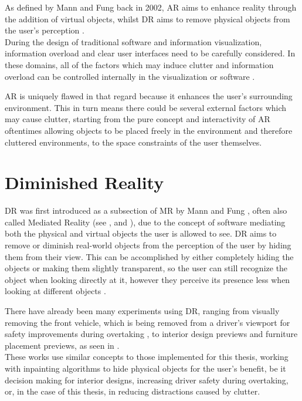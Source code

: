 As defined by Mann and Fung back in 2002, AR aims to enhance reality through the addition of virtual objects, whilst DR aims to remove physical objects from the user's perception \cite{Mann2002}.\\
During the design of traditional software and information visualization, information overload and clear user interfaces need to be carefully considered.
In these domains, all of the factors which may induce clutter and information overload can be controlled internally in the visualization or software \cite{RosenholtzRuth2007Mvc}.

AR is uniquely flawed in that regard because it enhances the user's surrounding environment. This in turn means there could be several external factors which may cause clutter, starting from the pure concept and interactivity of AR
oftentimes allowing objects to be placed freely in the environment and therefore cluttered environments, to the space constraints of the user themselves.

\section{Diminished Reality}
DR was first introduced as a subsection of MR by Mann and Fung \cite{Mann2002}, often also called Mediated Reality (see \cite{mann2002mediated}, \cite{grasset2003interactive} and \cite{PoelmanAkmanLukotsch2012}), due to the concept of software mediating both the physical and virtual objects the user is allowed to see.
DR aims to remove or diminish real-world objects from the perception of the user by hiding them from their view. This can be accomplished by either completely hiding the objects or making them slightly transparent, so the user can still recognize the object when looking directly at it,
however they perceive its presence less when looking at different objects \cite{ChengYiFei2022TUDR}.

There have already been many experiments using DR, ranging from visually removing the front vehicle, which is being removed from a driver's viewport for safety improvements during overtaking \cite{RameauFrancois2016ARAR}, to interior design previews and furniture placement previews, as seen in \cite{SiltanenSanni2017Drfa}.\\
These works use similar concepts to those implemented for this thesis, working with inpainting algorithms to hide physical objects for the user's benefit, be it decision making for interior designs, increasing driver safety during overtaking, or, in the case of this thesis, in reducing distractions caused by clutter.

